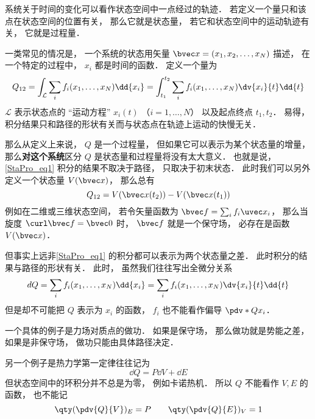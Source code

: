 
\begin{issues}
\issueDraft
\end{issues}

系统关于时间的变化可以看作状态空间中一点经过的轨迹． 若定义一个量只和该点在状态空间的位置有关， 那么它就是状态量， 若它和状态空间中的运动轨迹有关， 它就是过程量．

一类常见的情况是， 一个系统的状态用矢量 $\bvec x = (x_1, x_2, \dots, x_N)$ 描述， 在一个特定的过程中， $x_i$ 都是时间的函数． 定义一个量为
\begin{equation}\label{StaPro_eq1}
Q_{12} = \int_{\mathcal L} \sum_i f_i(x_1, \dots, x_N) \dd{x_i} = \int_{t_1}^{t_2} \sum_i f_i(x_1, \dots, x_N) \dv{x_i}{t} \dd{t}
\end{equation}
$\mathcal L$ 表示状态点的 “运动方程” $x_i(t)$ （$i = 1,\dots, N$） 以及起点终点 $t_1, t_2$． 易得，积分结果只和路径的形状有关而与状态点在轨迹上运动的快慢无关．

那么从定义上来说， $Q$ 是一个过程量， 但如果它可以表示为某个状态量的增量， 那么\textbf{对这个系统}区分 $Q$ 是状态量和过程量将没有太大意义． 也就是说， \autoref{StaPro_eq1} 积分的结果不取决于路径， 只取决于初末状态． 此时我们可以另外定义一个状态量 $V(\bvec x)$， 那么总有
\begin{equation}
Q_{12} = V(\bvec x(t_2)) - V(\bvec x(t_1))
\end{equation}
例如在二维或三维状态空间， 若令矢量函数为 $\bvec f = \sum_i f_i \uvec x_i$， 那么当旋度 $\curl \bvec f = \bvec 0$ 时， $\bvec f$ 就是一个保守场， 必存在是函数 $V(\bvec x)$．

但事实上远非\autoref{StaPro_eq1} 的积分都可以表示为两个状态量之差． 此时积分的结果与路径的形状有关． 此时， 虽然我们往往写出全微分关系
\begin{equation}
dQ = \sum_i f_i(x_1, \dots, x_N) \dd{x_i} = \sum_i f_i(x_1, \dots, x_N) \dv{x_i}{t} \dd{t}
\end{equation}
但是却不可能把 $Q$ 表示为 $x_i$ 的函数， $f_i$ 也不能看作偏导 $\pdv*{Q}{x_i}$．

一个具体的例子是力场对质点的做功． 如果是保守场， 那么做功就是势能之差， 如果是非保守场， 做功只能由具体路径决定．

另一个例子是热力学第一定律往往记为
\begin{equation}
\dd{Q} = P\dd{V} + \dd{E}
\end{equation}
但状态空间中的环积分并不总是为零， 例如卡诺热机． 所以 $Q$ 不能看作 $V, E$ 的函数， 也不能记
\begin{equation}
\qty(\pdv{Q}{V})_E = P \qquad \qty(\pdv{Q}{E})_V = 1
\end{equation}

